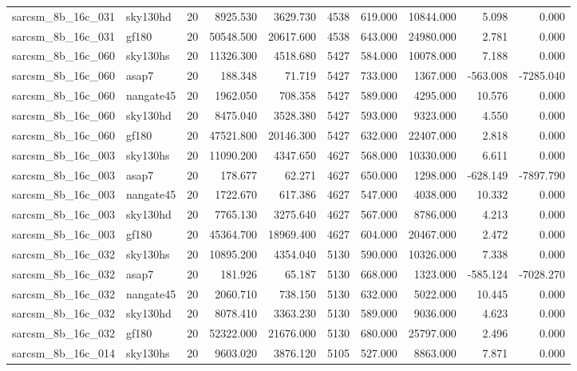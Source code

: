 \begin{longtable}{llrrrrrrrr}
sarcsm\_8b\_16c\_031 & sky130hd & 20 & 8925.530 & 3629.730 & 4538 & 619.000 & 10844.000 & 5.098 & 0.000 \\
sarcsm\_8b\_16c\_031 & gf180 & 20 & 50548.500 & 20617.600 & 4538 & 643.000 & 24980.000 & 2.781 & 0.000 \\
sarcsm\_8b\_16c\_060 & sky130hs & 20 & 11326.300 & 4518.680 & 5427 & 584.000 & 10078.000 & 7.188 & 0.000 \\
sarcsm\_8b\_16c\_060 & asap7 & 20 & 188.348 & 71.719 & 5427 & 733.000 & 1367.000 & -563.008 & -7285.040 \\
sarcsm\_8b\_16c\_060 & nangate45 & 20 & 1962.050 & 708.358 & 5427 & 589.000 & 4295.000 & 10.576 & 0.000 \\
sarcsm\_8b\_16c\_060 & sky130hd & 20 & 8475.040 & 3528.380 & 5427 & 593.000 & 9323.000 & 4.550 & 0.000 \\
sarcsm\_8b\_16c\_060 & gf180 & 20 & 47521.800 & 20146.300 & 5427 & 632.000 & 22407.000 & 2.818 & 0.000 \\
sarcsm\_8b\_16c\_003 & sky130hs & 20 & 11090.200 & 4347.650 & 4627 & 568.000 & 10330.000 & 6.611 & 0.000 \\
sarcsm\_8b\_16c\_003 & asap7 & 20 & 178.677 & 62.271 & 4627 & 650.000 & 1298.000 & -628.149 & -7897.790 \\
sarcsm\_8b\_16c\_003 & nangate45 & 20 & 1722.670 & 617.386 & 4627 & 547.000 & 4038.000 & 10.332 & 0.000 \\
sarcsm\_8b\_16c\_003 & sky130hd & 20 & 7765.130 & 3275.640 & 4627 & 567.000 & 8786.000 & 4.213 & 0.000 \\
sarcsm\_8b\_16c\_003 & gf180 & 20 & 45364.700 & 18969.400 & 4627 & 604.000 & 20467.000 & 2.472 & 0.000 \\
sarcsm\_8b\_16c\_032 & sky130hs & 20 & 10895.200 & 4354.040 & 5130 & 590.000 & 10326.000 & 7.338 & 0.000 \\
sarcsm\_8b\_16c\_032 & asap7 & 20 & 181.926 & 65.187 & 5130 & 668.000 & 1323.000 & -585.124 & -7028.270 \\
sarcsm\_8b\_16c\_032 & nangate45 & 20 & 2060.710 & 738.150 & 5130 & 632.000 & 5022.000 & 10.445 & 0.000 \\
sarcsm\_8b\_16c\_032 & sky130hd & 20 & 8078.410 & 3363.230 & 5130 & 589.000 & 9036.000 & 4.623 & 0.000 \\
sarcsm\_8b\_16c\_032 & gf180 & 20 & 52322.000 & 21676.000 & 5130 & 680.000 & 25797.000 & 2.496 & 0.000 \\
sarcsm\_8b\_16c\_014 & sky130hs & 20 & 9603.020 & 3876.120 & 5105 & 527.000 & 8863.000 & 7.871 & 0.000 \\

\end{longtable}
